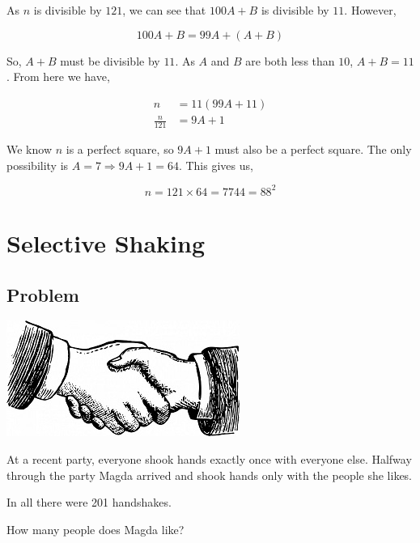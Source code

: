 \documentclass{book}
\begin{document}
As \(n\) is divisible by \(121\), we can see that \(100A+B\) is divisible by \(11\). However,

\begin{equation*}
100A+B=99A+(A+B)
\end{equation*}

So, \(A+B\) must be divisible by \(11\). As \(A\) and \(B\) are both less than \(10\), \(A+B=11\). From here we have,

\begin{align*}
  n&=11(99A+11)\\
  \frac{n}{121}&=9A+1
\end{align*}

We know \(n\) is a perfect square, so \(9A+1\) must also be a perfect square. The only possibility is \(A=7 \Rightarrow 9A+1=64\). This gives us,

\begin{equation*}
n=121\times 64=7744=88^2
\end{equation*}

\newpage

\section{Selective Shaking}
\subsection{Problem}

\begin{center}
\includegraphics{handshake}
\end{center}

At a recent party, everyone shook hands exactly once with everyone else. Halfway through the party Magda arrived and shook hands only with the people she likes.

In all there were 201 handshakes.

How many people does Magda like?
\end{document}
